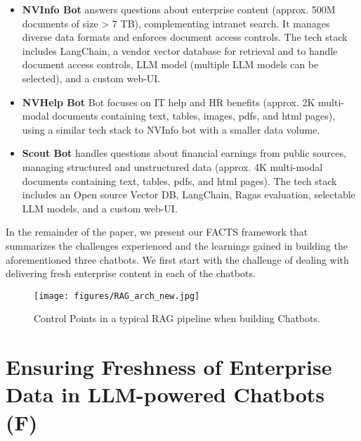 \documentclass[sigconf]{acmart}
\begin{document}
\begin{itemize}
    \item \textbf{NVInfo Bot} answers questions about enterprise content (approx. 500M documents of size > 7 TB), complementing intranet search. It manages diverse data formats and enforces document access controls. The tech stack includes LangChain, a vendor vector database for retrieval and to handle document access controls, LLM model (multiple LLM models can be selected), and a custom web-UI.
    \item \textbf{NVHelp Bot} Bot focuses on IT help and HR benefits (approx. 2K multi-modal documents containing text, tables, images, pdfs, and html pages), using a similar tech stack to NVInfo bot with a smaller data volume.
    \item \textbf{Scout Bot} handles questions about financial earnings from public sources, managing structured and unstructured data (approx. 4K multi-modal documents containing text, tables, pdfs, and html pages). The tech stack includes an Open source Vector DB, LangChain, Ragas evaluation, selectable LLM models, and a custom web-UI.
\end{itemize}

In the remainder of the paper, we present our FACTS framework that summarizes the challenges experienced and the learnings gained in building the aforementioned three chatbots. We first start with the challenge of dealing with delivering fresh enterprise content in each of the chatbots.

\begin{comment}
\begin{figure*}[ht]
    \centering
    \texttt{[image: figures/NVBot\_workflow.png]}
     \vspace{-3mm}
    \caption{Architecture of an Enterprise Chatbot}
    \vspace{-5mm}
    \label{fig:arch}
\end{figure*}
\end{comment}

\begin{figure*}[h]
  \texttt{[image: figures/RAG\_arch\_new.jpg]}
  \caption{Control Points in a typical RAG pipeline when building Chatbots.}
  \label{fig:RAG_control_points}
\end{figure*}

\section{Ensuring Freshness of Enterprise Data in LLM-powered Chatbots (F)}
\end{document}
